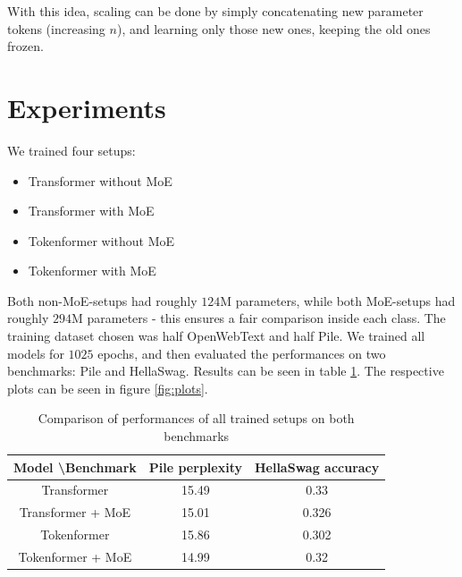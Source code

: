\documentclass[twoside,11pt]{article}
\begin{document}
With this idea, scaling can be done by simply concatenating new parameter tokens (increasing $n$), and learning only those new ones, keeping the old ones frozen.













\section{Experiments}
\label{sec:experiments}

We trained four setups:
\begin{itemize}
    \item Transformer without MoE
    \item Transformer with MoE
    \item Tokenformer without MoE
    \item Tokenformer with MoE
\end{itemize}

Both non-MoE-setups had roughly $124$M parameters, while both MoE-setups had roughly $294$M parameters - this ensures a fair comparison inside each class. The training dataset chosen was half OpenWebText and half Pile. We trained all models for $1025$ epochs, and then evaluated the performances on two benchmarks: Pile and HellaSwag. Results can be seen in table \ref{tab:results}. The respective plots can be seen in figure \ref{fig:plots}.

\begin{table}[h]
    \centering
    \begin{tabular}{|c||c c|}
        \hline
        Model \textbackslash Benchmark & Pile perplexity & HellaSwag accuracy \\
        \hline\hline
        Transformer & 15.49 & 0.33 \\
        \hline
        Transformer + MoE & 15.01 & 0.326 \\
        \hline
        Tokenformer & 15.86 & 0.302 \\
        \hline
        Tokenformer + MoE & 14.99 & 0.32 \\
        \hline
    \end{tabular}
    \caption{Comparison of performances of all trained setups on both benchmarks}
    \label{tab:results}
\end{table}
\end{document}
